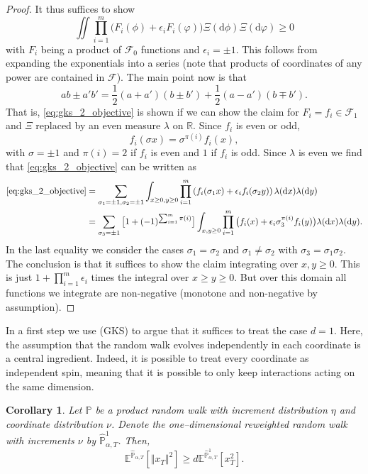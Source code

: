 \documentclass[reqno,11pt]{amsart}
\newcommand{\1}{\mathds{1}}
\theoremstyle{plain}
\newtheorem{corollary}[theorem]{Corollary}
\theoremstyle{definition}
\numberwithin{equation}{section}
\newcommand{\nn}{\nonumber}
\newcommand{\caF}{{\mathcal F}}
\newcommand{\bbE}{{\mathbb E}}
\newcommand{\bbP}{{\mathbb P}}
\newcommand{\bbR}{{\mathbb R}}
\newcommand{\de}{{\mathrm{d}}}
\newcommand{\bbPh}{\hat{\bbP}}
\def\lt{\left}
\def\rt{\right}
\begin{document}
\begin{proof}
    It thus suffices to show
    \begin{equation}
    \label{eq:gks_2_objective}
    \iint \prod\limits_{i=1} ^m \big( F_i (\phi) + \epsilon_i F_i(\varphi) \big) \Xi( \de \phi) \Xi( \de \varphi) \ge 0
    \end{equation}
    with $F_i$ being a product of $\caF_0$ functions and $\epsilon_i = \pm 1$. This follows from expanding the exponentials into a series (note that products of coordinates of any power are contained in $\caF$). The main point now is that
    $$ab \pm a'b' = \frac 1 2 (a + a')(b \pm b') + \frac 1 2 (a-a')(b \mp b').$$
    That is, \eqref{eq:gks_2_objective} is shown if we can show the claim for $F_i = f_i \in \caF_1$ and $\Xi$ replaced by an even measure $\lambda$ on $\bbR$.
    Since $f_i$ is even or odd,
    $$f_i (\sigma x) = \sigma^{\pi(i)} f_i(x),$$
    with $\sigma = \pm 1$ and  $\pi(i) =2$ if $f_i$ is even and $1$ if $f_i$ is odd. Since $\lambda$ is even we find that \eqref{eq:gks_2_objective} can be written as
    \begin{equation}
        \nn
        \begin{split}
            \eqref{eq:gks_2_objective} &=\sum\limits_{\sigma_1 = \pm 1, \sigma_2 =\pm 1} \int_{x \ge 0, y \ge 0}  \prod\limits_{i=1} ^m \lt( f_i( \sigma_1 x) + \epsilon_i f_i (\sigma_2 y) \rt)  \lambda(\de x)  \lambda(\de y) \\
            &= \sum\limits_{\sigma_3 = \pm 1} \big[ 1+ (-1)^{\sum_{i=1}^m\pi(i)} \big] \int_{x,y \ge 0} \prod\limits_{i=1} ^m  \big( f_i (x) + \epsilon_i \sigma_3 ^{\pi(i)} f_i (y) \big)  \lambda(\de x)  \lambda (\de y). 
        \end{split}
    \end{equation}
In the last equality we consider the cases $\sigma_1 = \sigma_2$ and $\sigma_1 \neq \sigma_2$ with $\sigma_3 = \sigma_1 \sigma_2$. The conclusion is that it suffices to show the claim integrating over $x,y \ge 0$. This is just $1+\prod_{i=1}^m \epsilon_i$
times the integral over $x \ge y \ge 0$. But over this domain all functions we integrate are non-negative (monotone and non-negative by assumption).
\end{proof}

In a first step we use (GKS) to argue that it suffices to treat the case $d=1$. Here, the assumption that the random walk evolves independently in each coordinate is a central ingredient. Indeed, it is possible to treat every coordinate as independent spin, meaning that it is possible to only keep interactions acting on the same dimension.
\begin{corollary}
    \label{cor:1d_suffices}
    Let $\bbP$ be a product random walk with increment distribution $\eta$ and coordinate distribution $\nu$. Denote the one--dimensional reweighted random walk with increments $\nu$ by
    $\bbPh^1 _{\alpha,T}$. Then,
    $$\bbE^{\bbPh_{\alpha,T}}[\Vert x_T \Vert ^2] \ge d \bbE^{\bbPh^1 _{\alpha,T}}[x_T ^2].$$
\end{corollary}
\end{document}
